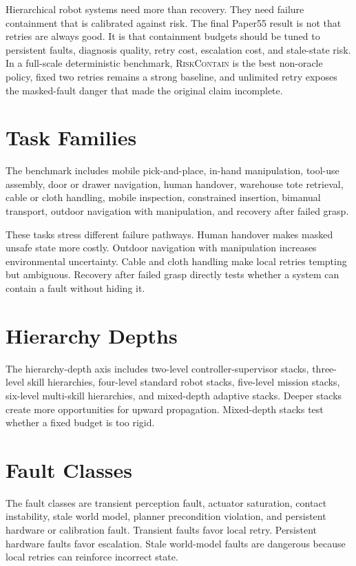 \documentclass{article}
\newcommand{\method}{\textsc{RiskContain}\xspace}
\begin{document}
Hierarchical robot systems need more than recovery. They need failure containment that is calibrated against risk. The final Paper55 result is not that retries are always good. It is that containment budgets should be tuned to persistent faults, diagnosis quality, retry cost, escalation cost, and stale-state risk. In a full-scale deterministic benchmark, \method is the best non-oracle policy, fixed two retries remains a strong baseline, and unlimited retry exposes the masked-fault danger that made the original claim incomplete.

\appendix
\renewcommand{\thesection}{\arabic{section}}

\section{Task Families}

The benchmark includes mobile pick-and-place, in-hand manipulation, tool-use assembly, door or drawer navigation, human handover, warehouse tote retrieval, cable or cloth handling, mobile inspection, constrained insertion, bimanual transport, outdoor navigation with manipulation, and recovery after failed grasp.

These tasks stress different failure pathways. Human handover makes masked unsafe state more costly. Outdoor navigation with manipulation increases environmental uncertainty. Cable and cloth handling make local retries tempting but ambiguous. Recovery after failed grasp directly tests whether a system can contain a fault without hiding it.

\section{Hierarchy Depths}

The hierarchy-depth axis includes two-level controller-supervisor stacks, three-level skill hierarchies, four-level standard robot stacks, five-level mission stacks, six-level multi-skill hierarchies, and mixed-depth adaptive stacks. Deeper stacks create more opportunities for upward propagation. Mixed-depth stacks test whether a fixed budget is too rigid.

\section{Fault Classes}

The fault classes are transient perception fault, actuator saturation, contact instability, stale world model, planner precondition violation, and persistent hardware or calibration fault. Transient faults favor local retry. Persistent hardware faults favor escalation. Stale world-model faults are dangerous because local retries can reinforce incorrect state.
\end{document}
